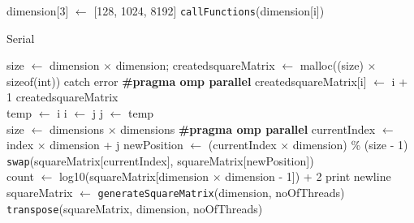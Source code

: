 \documentclass[10pt,twocolumn]{witseiepaper}
\begin{document}
\begin{appendix}
\begin{algorithm}[htbp]
\begin{algorithmic}
		\State dimension[3] $\leftarrow$ [128, 1024, 8192]
		\State \verb|callFunctions|(dimension[i])
		\EndFor
		\State {}
		\EndFunction
		
		\caption{Serial}
		\label{alg:2}
	\end{algorithmic}
\end{algorithm}

\begin{algorithm}[htbp]
	\begin{algorithmic}
		
		\State size $\leftarrow$ dimension $\times$ dimension;
		\State created\textunderscore squareMatrix $\leftarrow$ malloc((size) $\times$ sizeof(int))
		\State catch error
		\EndIf 
		\State \textbf{\#pragma omp parallel}
		\State\hspace{\algorithmicindent}
		\State created\textunderscore squareMatrix[i] $\leftarrow$ i + 1
		\EndFor
		\EndFunction
		\State \Return created\textunderscore squareMatrix \\
		
		\State temp $\leftarrow$ i
		\State i $\leftarrow$ j
		\State j $\leftarrow$ temp
		\EndFunction \\
		
		\State size $\leftarrow$ dimensions $\times$ dimensions
		\State \textbf{\#pragma omp parallel}
		\State currentIndex $\leftarrow$ index $\times$ dimension + j
		\State newPosition $\leftarrow$ (currentIndex $\times$ dimension) \% (size - 1)
		\EndFor
		\EndFor
		\State \verb|swap|(squareMatrix[currentIndex], squareMatrix[newPosition])
		\EndFunction \\
		
		\State count $\leftarrow$ log10(squareMatrix[dimension $\times$ dimension - 1]) + 2
		\State print newline
		\EndIf
		\EndFor
		\EndFunction \\
		
		\State squareMatrix $\leftarrow$ \verb|generateSquareMatrix|(dimension, noOfThreads)
		\State \verb|transpose|(squareMatrix, dimension, noOfThreads)
		\EndFunction \\
		

\end{algorithmic}
\end{algorithm}
\end{appendix}
\end{document}

